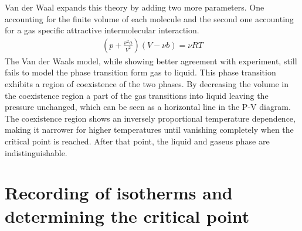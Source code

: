 \documentclass[a4paper,10pt,twocolumn]{article}
\begin{document}
    Van der Waal expands this theory by adding two more parameters.
    One accounting for the finite volume of each molecule and the second one accounting for a gas specific attractive intermolecular interaction.
    \begin{align}
    (p+\frac{\nu^2 a}{V^2})(V-\nu b) = \nu RT
    \end{align}
    The Van der Waals model, while showing better agreement with experiment, still fails to model the phase transition form gas to liquid.
    This phase transition exhibits a region of coexistence of the two phases. 
    By decreasing the volume in the coexistence region a part of the gas transitions into liquid leaving the pressure unchanged, which can be seen as a horizontal line in the P-V diagram.
    The coexistence region shows an inversely proportional temperature dependence, making it narrower for higher temperatures until vanishing completely when the critical point is reached.
    After that point, the liquid and gaseus phase are indistinguishable.
    \section{Recording of isotherms and determining the critical point}
    \label{sec:Measurement}

    
\end{document}
